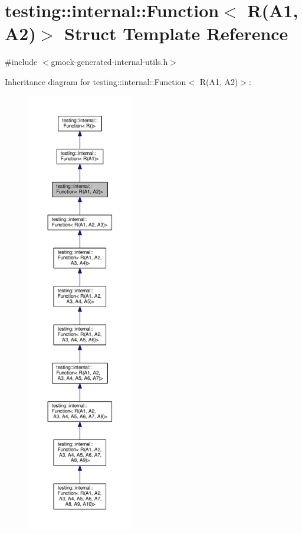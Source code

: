 \hypertarget{structtesting_1_1internal_1_1Function_3_01R_07A1_00_01A2_08_4}{}\section{testing\+:\+:internal\+:\+:Function$<$ R(A1, A2)$>$ Struct Template Reference}
\label{structtesting_1_1internal_1_1Function_3_01R_07A1_00_01A2_08_4}


{\ttfamily \#include $<$gmock-\/generated-\/internal-\/utils.\+h$>$}



Inheritance diagram for testing\+:\+:internal\+:\+:Function$<$ R(A1, A2)$>$\+:\nopagebreak
\begin{figure}[H]
\begin{center}
\leavevmode
\includegraphics[height=550pt]{structtesting_1_1internal_1_1Function_3_01R_07A1_00_01A2_08_4__inherit__graph}
\end{center}
\end{figure}


